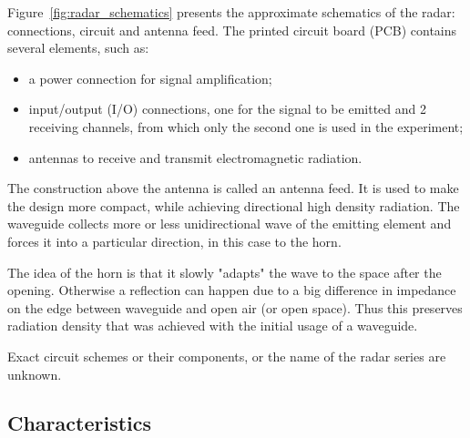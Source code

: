 \documentclass{article}
\begin{document}
Figure~\ref{fig:radar_schematics} presents the approximate schematics of the radar: connections, circuit and antenna feed.
The printed circuit board (PCB) contains several elements, such as:
\begin{itemize}
    \item a power connection for signal amplification;
    \item input/output (I/O) connections, one for the signal to be emitted and 2 receiving channels, from which only the second one is used in the experiment;
    \item antennas to receive and transmit electromagnetic radiation.
\end{itemize}

The construction above the antenna is called an antenna feed.
It is used to make the design more compact, while achieving directional high density radiation.
The waveguide collects more or less unidirectional wave of the emitting element and forces it into a particular direction, in this case to the horn.

The idea of the horn is that it slowly "adapts" the wave to the space after the opening.
Otherwise a reflection can happen due to a big difference in impedance on the edge between waveguide and open air (or open space).
Thus this preserves radiation density that was achieved with the initial usage of a waveguide.

Exact circuit schemes or their components, or the name of the radar series are unknown.

\subsection{Characteristics}
\label{subsec:characteristics}
\end{document}
